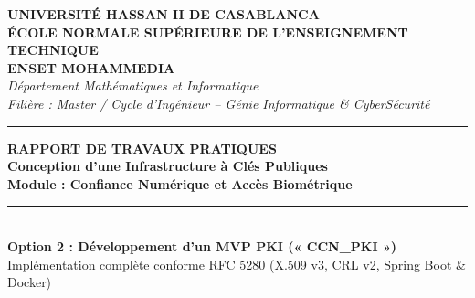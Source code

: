 \documentclass[12pt,a4paper]{report}
\begin{document}
\begin{titlepage}
    \begin{center}
        {\large \textbf{UNIVERSITÉ HASSAN II DE CASABLANCA}}\\[0.2cm]
        {\large \textbf{ÉCOLE NORMALE SUPÉRIEURE DE L'ENSEIGNEMENT TECHNIQUE}}\\[0.1cm]
        {\Large \textbf{ENSET MOHAMMEDIA}}\\[0.2cm]
        {\normalsize \textit{Département Mathématiques et Informatique}}\\[0.1cm]
        {\normalsize \textit{Filière : Master / Cycle d'Ingénieur -- Génie Informatique \& CyberSécurité}}\\[0.6cm]

        \rule{0.75\textwidth}{1.2pt}

        \vspace{0.8cm}

        \begin{tcolorbox}[colback=ensetblue!5, colframe=ensetblue, width=\textwidth, arc=3mm, boxrule=1.5pt]
            \centering
            \vspace{0.3cm}
            {\Large \textbf{RAPPORT DE TRAVAUX PRATIQUES}}\\[0.3cm]
            {\LARGE \textbf{Conception d'une Infrastructure à Clés Publiques}}\\[0.2cm]
            {\Large \textbf{Module : Confiance Numérique et Accès Biométrique}}\\[0.3cm]
            \rule{0.85\textwidth}{0.8pt}\\[0.3cm]
            {\large \textbf{Option 2 : Développement d'un MVP PKI (« CCN\_PKI »)}}\\[0.1cm]
            {\small Implémentation complète conforme RFC 5280 (X.509 v3, CRL v2, Spring Boot \& Docker)}
            \vspace{0.3cm}
        \end{tcolorbox}

        \vspace{1.2cm}


\end{center}
\end{titlepage}
\end{document}
